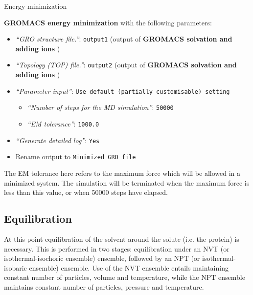 \documentclass[twocolumn]{bmcart}%
\providecommand{\tightlist}{%
  \setlength{\itemsep}{0pt}\setlength{\parskip}{0pt}}
\begin{document}
\begin{handson_box_colour}{Energy minimization}


  \textbf{GROMACS energy minimization} with the following parameters:

  \begin{itemize}
  \tightlist
  \item
    \emph{``GRO structure file.''}: \texttt{output1} (output of
    \textbf{GROMACS solvation and adding ions} )
  \item
    \emph{``Topology (TOP) file.''}: \texttt{output2} (output of
    \textbf{GROMACS solvation and adding ions} )
  \item
    \emph{``Parameter input''}:
    \texttt{Use\ default\ (partially\ customisable)\ setting}

    \begin{itemize}
    \tightlist
    \item
      \emph{``Number of steps for the MD simulation''}: \texttt{50000}
    \item
      \emph{``EM tolerance''}: \texttt{1000.0}
    \end{itemize}
  \item
    \emph{``Generate detailed log''}: \texttt{Yes}
  \item
    Rename output to \texttt{Minimized\ GRO\ file}
  \end{itemize}

\end{handson_box_colour}

The EM tolerance here refers to the maximum force which will be allowed in a minimized system. The simulation will be terminated when the maximum force is less than this value, or when 50000 steps have elapsed.

\subsection*{Equilibration}\label{equilibration}

At this point equilibration of the solvent around the solute (i.e. the protein) is necessary. This is performed in two stages: equilibration under an NVT (or isothermal-isochoric ensemble) ensemble, followed by an NPT (or isothermal-isobaric ensemble) ensemble. Use of the NVT ensemble entails maintaining constant number of particles, volume and temperature, while the NPT ensemble maintains constant number of particles, pressure and temperature.
\end{document}
